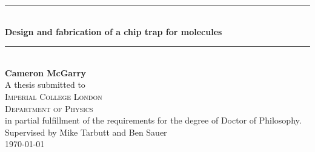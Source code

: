 \begin{titlepage}



\begin{minipage}{14cm}
  \begin{flushleft}
    \vspace*{4cm}
    \rule{\linewidth}{0.5mm} \\[0.4cm]
    {\huge \bfseries Design and fabrication of a chip trap for \CaF{} molecules}\\
    \rule{\linewidth}{0.5mm} \\[1.0cm]
    {\large \textbf{Cameron McGarry}} \\[1.0cm]
    {
    A thesis submitted to \\
    {\large \textsc{Imperial College London}} \\
    {\large \textsc{Department of Physics}} \\
    in partial fulfillment of the requirements for the degree of Doctor of
    Philosophy. \\[5mm]
    }
    Supervised by Mike Tarbutt and Ben Sauer \\[5mm]
    \makeatletter
    \monthyeardate\today
    \makeatother
    \restoregeometry
  \end{flushleft}
\end{minipage}

\end{titlepage}
